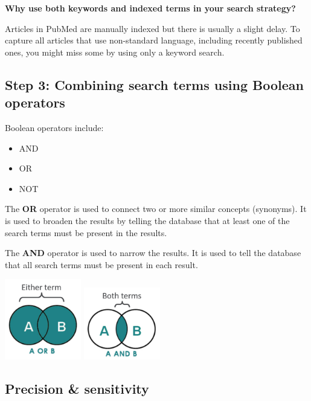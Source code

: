 \documentclass[
]{book}
\begin{document}
\textbf{Why use both keywords and indexed terms in your search strategy?}

Articles in PubMed are manually indexed but there is usually a slight delay. To capture all articles that use non-standard language, including recently published ones, you might miss some by using only a keyword search.

\subsection{Step 3: Combining search terms using Boolean operators}\label{step-3-combining-search-terms-using-boolean-operators}

Boolean operators include:

\begin{itemize}
\item
  AND
\item
  OR
\item
  NOT
\end{itemize}

The \textbf{OR} operator is used to connect two or more similar concepts (synonyms). It is used to broaden the results by telling the database that at least one of the search terms must be present in the results.

The \textbf{AND} operator is used to narrow the results. It is used to tell the database that all search terms must be present in each result.

\includegraphics[width=0.25\textwidth,height=0.25\textheight]{figs/booleanOR.png}
\includegraphics[width=0.25\textwidth,height=0.25\textheight]{figs/booleanAND.png}

\subsection{Precision \& sensitivity}\label{precision-sensitivity}
\end{document}
